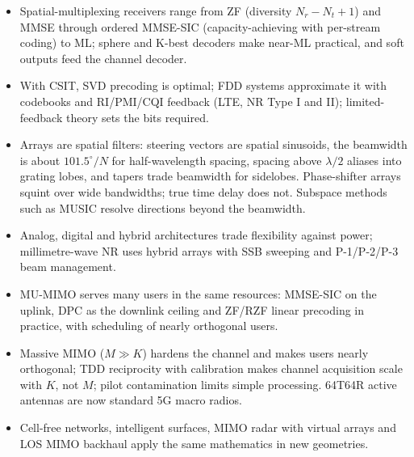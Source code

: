 \begin{itemize}
\item Spatial-multiplexing receivers range from ZF (diversity $N_r-N_t+1$) and MMSE through ordered
MMSE-SIC (capacity-achieving with per-stream coding) to ML; sphere and K-best decoders make near-ML
practical, and soft outputs feed the channel decoder.
\item With CSIT, SVD precoding is optimal; FDD systems approximate it with codebooks and RI/PMI/CQI
feedback (LTE, NR Type I and II); limited-feedback theory sets the bits required.
\item Arrays are spatial filters: steering vectors are spatial sinusoids, the beamwidth is about
$101.5^\circ/N$ for half-wavelength spacing, spacing above $\lambda/2$ aliases into grating lobes,
and tapers trade beamwidth for sidelobes. Phase-shifter arrays squint over wide bandwidths; true
time delay does not. Subspace methods such as MUSIC resolve directions beyond the beamwidth.
\item Analog, digital and hybrid architectures trade flexibility against power; millimetre-wave NR
uses hybrid arrays with SSB sweeping and P-1/P-2/P-3 beam management.
\item MU-MIMO serves many users in the same resources: MMSE-SIC on the uplink, DPC as the downlink
ceiling and ZF/RZF linear precoding in practice, with scheduling of nearly orthogonal users.
\item Massive MIMO ($M\gg K$) hardens the channel and makes users nearly orthogonal; TDD reciprocity
with calibration makes channel acquisition scale with $K$, not $M$; pilot contamination limits
simple processing. 64T64R active antennas are now standard 5G macro radios.
\item Cell-free networks, intelligent surfaces, MIMO radar with virtual arrays and LOS MIMO backhaul
apply the same mathematics in new geometries.
\end{itemize}

